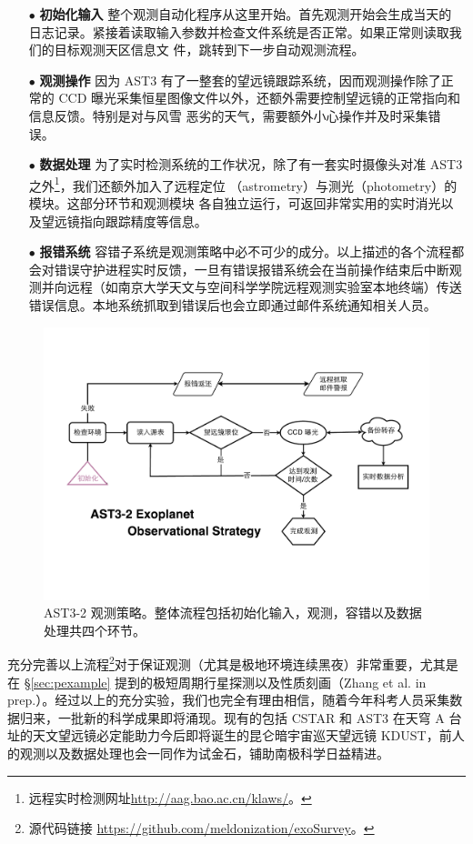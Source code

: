 \begin{enumerate}[leftmargin=1\parindent] 

\item[\tiny$\bullet$] \textbf{初始化输入} {} 整个观测自动化程序从这里开始。首先观测开始会生成当天的
日志记录。紧接着读取输入参数并检查文件系统是否正常。如果正常则读取我们的目标观测天区信息文
件，跳转到下一步自动观测流程。


\item[\tiny$\bullet$] \textbf{观测操作} {} 因为 AST3 有了一整套的望远镜跟踪系统，因而观测操作除了正
常的 CCD 曝光采集恒星图像文件以外，还额外需要控制望远镜的正常指向和信息反馈。特别是对与风雪
恶劣的天气，需要额外小心操作并及时采集错误。


\item[\tiny$\bullet$] \textbf{数据处理} {} 为了实时检测系统的工作状况，除了有一套实时摄像头对准 
AST3之外\footnote{远程实时检测网址\url{http://aag.bao.ac.cn/klaws/}。}，我们还额外加入了远程定位
（astrometry）与测光（photometry）的模块。这部分环节和观测模块
各自独立运行，可返回非常实用的实时消光以及望远镜指向跟踪精度等信息。


\item[\tiny$\bullet$] \textbf{报错系统} {} 容错子系统是观测策略中必不可少的成分。以上描述的各个流程都会对错误守护进程实时反馈，一旦有错误报错系统会在当前操作结束后中断观测并向远程（如南京大学天文与空间科学学院远程观测实验室本地终端）传送错误信息。本地系统抓取到错误后也会立即通过邮件系统通知相关人员。

\end{enumerate}

\begin{figure}[t]
\centering
\includegraphics[width=1.0\textwidth]{figures/chapter2/f12_ast3pipeline.pdf}
\caption{AST3-2 观测策略。整体流程包括初始化输入，观测，容错以及数据处理共四个环节。}
\label{fig:ast3obs}
\end{figure}

充分完善以上流程\footnote{源代码链接 \url{https://github.com/meldonization/exoSurvey}。}对于保证观测（尤其是极地环境连续黑夜）非常重要，尤其是在 \S \ref{sec:pexample} 提到的极短周期行星探测以及性质刻画（Zhang et al. in prep.）。经过以上的充分实验，我们也完全有理由相信，随着今年科考人员采集数据归来，一批新的科学成果即将涌现。现有的包括 CSTAR 和 AST3 在天穹 A 台址的天文望远镜必定能助力今后即将诞生的昆仑暗宇宙巡天望远镜 KDUST，前人的观测以及数据处理也会一同作为试金石，铺助南极科学日益精进。


